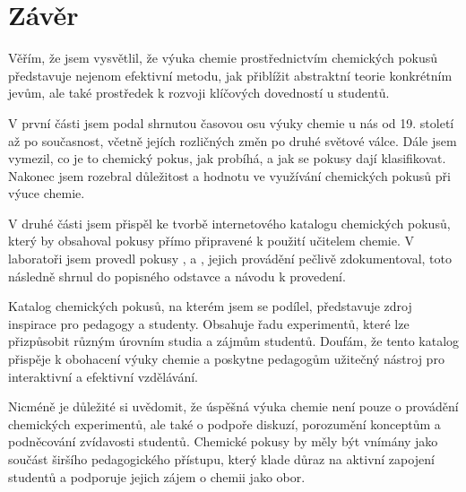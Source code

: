 \newpage
\vspace{-10pt}
\chapter*{Závěr}
\vspace{-10pt}
Věřím, že jsem vysvětlil, že výuka chemie prostřednictvím chemických pokusů představuje nejenom efektivní metodu, jak přiblížit abstraktní teorie konkrétním jevům, ale také prostředek k rozvoji klíčových dovedností u studentů.

V první části jsem podal shrnutou časovou osu výuky chemie u nás od 19. století až po současnost, včetně jejích rozličných změn po druhé světové válce. Dále jsem vymezil, co je to chemický pokus, jak probíhá, a jak se pokusy dají klasifikovat. Nakonec jsem rozebral důležitost a hodnotu ve využívání chemických pokusů při výuce chemie.

V druhé části jsem přispěl ke tvorbě internetového katalogu chemických pokusů, který by obsahoval pokusy přímo připravené k použití učitelem chemie. V laboratoři jsem provedl pokusy ,  a , jejich provádění pečlivě zdokumentoval, toto následně shrnul do popisného odstavce a návodu k provedení.

Katalog chemických pokusů, na kterém jsem se podílel, představuje zdroj inspirace pro pedagogy a studenty. Obsahuje řadu experimentů, které lze přizpůsobit různým úrovním studia a zájmům studentů. Doufám, že tento katalog přispěje k obohacení výuky chemie a poskytne pedagogům užitečný nástroj pro interaktivní a efektivní vzdělávání.

Nicméně je důležité si uvědomit, že úspěšná výuka chemie není pouze o provádění chemických experimentů, ale také o podpoře diskuzí, porozumění konceptům a podněcování zvídavosti studentů. Chemické pokusy by měly být vnímány jako součást širšího pedagogického přístupu, který klade důraz na aktivní zapojení studentů a podporuje jejich zájem o chemii jako obor.
